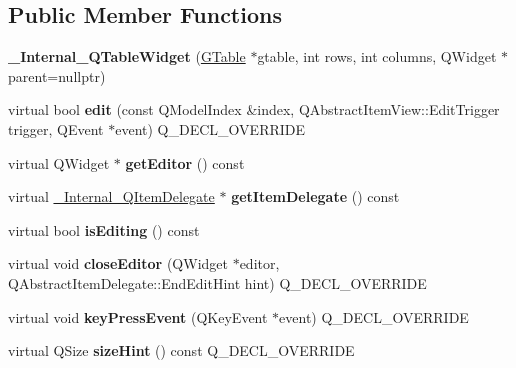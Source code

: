 \subsection*{Public Member Functions}
\begin{DoxyCompactItemize}
\item 
\mbox{\label{class__Internal__QTableWidget_a1456a138a56987ce8dbe2d9ad242fbb7}} 
{\bfseries \+\_\+\+Internal\+\_\+\+Q\+Table\+Widget} (\mbox{\hyperlink{classGTable}{G\+Table}} $\ast$gtable, int rows, int columns, Q\+Widget $\ast$parent=nullptr)
\item 
\mbox{\label{class__Internal__QTableWidget_a150f1799c6ad633238c69a5f14807d82}} 
virtual bool {\bfseries edit} (const Q\+Model\+Index \&index, Q\+Abstract\+Item\+View\+::\+Edit\+Trigger trigger, Q\+Event $\ast$event) Q\+\_\+\+D\+E\+C\+L\+\_\+\+O\+V\+E\+R\+R\+I\+DE
\item 
\mbox{\label{class__Internal__QTableWidget_a08f76cfc6443fa33bc7183260538d879}} 
virtual Q\+Widget $\ast$ {\bfseries get\+Editor} () const
\item 
\mbox{\label{class__Internal__QTableWidget_a3d482c8f78001b501d3b9403fb95031d}} 
virtual \mbox{\hyperlink{class__Internal__QItemDelegate}{\+\_\+\+Internal\+\_\+\+Q\+Item\+Delegate}} $\ast$ {\bfseries get\+Item\+Delegate} () const
\item 
\mbox{\label{class__Internal__QTableWidget_a1498455e3a114626341891f8e16e5f57}} 
virtual bool {\bfseries is\+Editing} () const
\item 
\mbox{\label{class__Internal__QTableWidget_aa1c6d89ed6f01c302db19296ee806efc}} 
virtual void {\bfseries close\+Editor} (Q\+Widget $\ast$editor, Q\+Abstract\+Item\+Delegate\+::\+End\+Edit\+Hint hint) Q\+\_\+\+D\+E\+C\+L\+\_\+\+O\+V\+E\+R\+R\+I\+DE
\item 
\mbox{\label{class__Internal__QTableWidget_a72868b020f368561b0ffc96a49b7882c}} 
virtual void {\bfseries key\+Press\+Event} (Q\+Key\+Event $\ast$event) Q\+\_\+\+D\+E\+C\+L\+\_\+\+O\+V\+E\+R\+R\+I\+DE
\item 
\mbox{\label{class__Internal__QTableWidget_a27d8a9816973accffe7324b5ac72d2ed}} 
virtual Q\+Size {\bfseries size\+Hint} () const Q\+\_\+\+D\+E\+C\+L\+\_\+\+O\+V\+E\+R\+R\+I\+DE
\end{DoxyCompactItemize}


